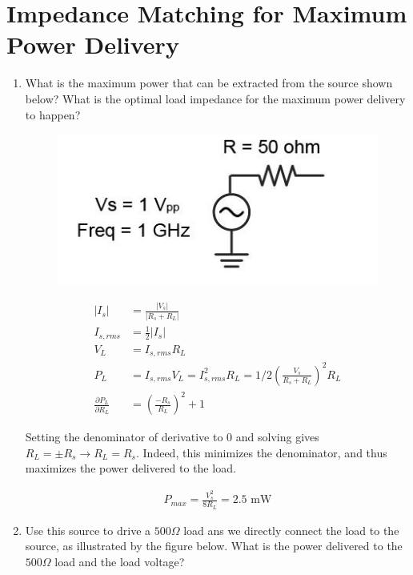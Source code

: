 \documentclass[11pt]{article}
\begin{document}
\section{Impedance Matching for Maximum Power Delivery}

\begin{enumerate}
	\item What is the maximum power that can be extracted from the source shown below? What is the optimal load impedance for the maximum power delivery to happen?
		\begin{figure}[H]
		\centering \includegraphics[width=\textwidth-10cm]{images/problem3a.jpg}
	\end{figure}
	
	\begin{align*}
		|I_{s}| &= \frac{|V_s|}{|R_s + R_L|} \\
		I_{s,rms} &= \frac{1}{2} |I_{s}| \\
		V_{L} &= I_{s,rms} R_L \\
		P_{L} &= I_{s,rms} V_L = I_{s,rms}^2 R_L = 1/2 (\frac{V_s}{R_s + R_L})^2 R_L \\
		\frac{\partial P_L}{\partial R_L} &= (\frac{-R_s}{R_L})^2 + 1
	\end{align*}
	
	Setting the denominator of derivative to 0 and solving gives $R_L = \pm R_s \rightarrow R_L = R_s$. Indeed, this minimizes the denominator, and thus maximizes the power delivered to the load.
	
	\begin{align*}
		P_{max} = \frac{V_s^2}{8 R_L} = 2.5 \text{ mW}
	\end{align*}
	
	\item Use this source to drive a $500\Omega$ load ans we directly connect the load to the source, as illustrated by the figure below. What is the power delivered to the $500 \Omega$ load and the load voltage?
	

\end{enumerate}
\end{document}
